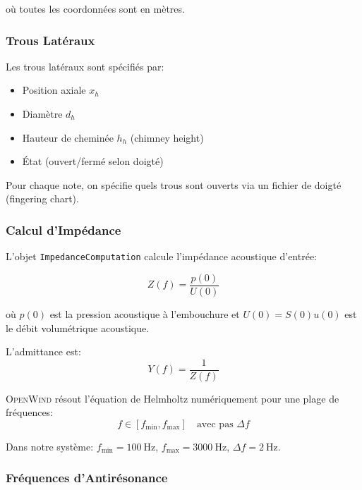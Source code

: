 \documentclass[12pt,a4paper,twocolumn]{article}
\newcommand{\openwind}{\textsc{OpenWind}}
\newcommand{\impedance}{Z}
\newcommand{\admittance}{Y}
\begin{document}
où toutes les coordonnées sont en mètres.

\subsubsection{Trous Latéraux}

Les trous latéraux sont spécifiés par:
\begin{itemize}
    \item Position axiale $x_h$
    \item Diamètre $d_h$
    \item Hauteur de cheminée $h_h$ (chimney height)
    \item État (ouvert/fermé selon doigté)
\end{itemize}

Pour chaque note, on spécifie quels trous sont ouverts via un fichier de doigté (fingering chart).

\subsubsection{Calcul d'Impédance}

L'objet \texttt{ImpedanceComputation} calcule l'impédance acoustique d'entrée:

\begin{equation}
\impedance(f) = \frac{p(0)}{U(0)}
\label{eq:impedance}
\end{equation}

où $p(0)$ est la pression acoustique à l'embouchure et $U(0) = S(0) u(0)$ est le débit volumétrique acoustique.

L'admittance est:
\begin{equation}
\admittance(f) = \frac{1}{\impedance(f)}
\label{eq:admittance}
\end{equation}

\openwind{} résout l'équation de Helmholtz numériquement pour une plage de fréquences:
\begin{equation}
f \in [f_{\min}, f_{\max}] \quad \text{avec pas } \Delta f
\label{eq:plage_frequences}
\end{equation}

Dans notre système: $f_{\min} = \SI{100}{\hertz}$, $f_{\max} = \SI{3000}{\hertz}$, $\Delta f = \SI{2}{\hertz}$.

\subsubsection{Fréquences d'Antirésonance}
\end{document}
